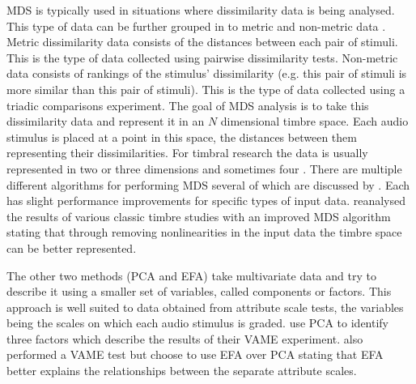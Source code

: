 		MDS is typically used in situations where dissimilarity data is being analysed. This type of data can be
		further grouped in to metric and non-metric data \citep{hair2013multivariate}. Metric dissimilarity data
		consists of the distances between each pair of stimuli. This is the type of data collected using pairwise
		dissimilarity tests. Non-metric data consists of rankings of the stimulus' dissimilarity (e.g. this pair of
		stimuli is more similar than this pair of stimuli). This is the type of data collected using a triadic
		comparisons experiment. The goal of MDS analysis is to take this dissimilarity data and represent it in an
		$N$ dimensional timbre space. Each audio stimulus is placed at a point in this space, the distances between
		them representing their dissimilarities. For timbral research the data is usually represented in two
		\citep{giragama2003relating} or three \citep{grey1978perceptual} dimensions and sometimes four
		\citep{bernays2011verbal}. There are multiple different algorithms for performing MDS several of which are
		discussed by \citet{mcadams1999perspectives}. Each has slight performance improvements for specific types
		of input data.  \citet{burgoyne2008a} reanalysed the results of various classic timbre studies with an
		improved MDS algorithm stating that through removing nonlinearities in the input data the timbre space can
		be better represented.

		The other two methods (PCA and EFA) take multivariate data and try to describe it using a smaller set of
		variables, called components or factors. This approach is well suited to data obtained from attribute scale
		tests, the variables being the scales on which each audio stimulus is graded. \citet{kendall1993verbal1}
		use PCA to identify three factors which describe the results of their VAME experiment.
		\citet{zacharakis2012analysis} also performed a VAME test but choose to use EFA over PCA stating that EFA
		better explains the relationships between the separate attribute scales.

